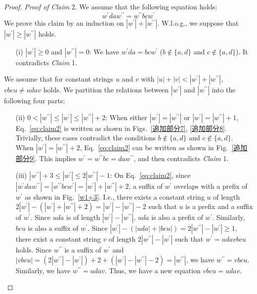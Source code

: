 \begin{proof}
  \noindent
  \textit{Proof of Claim} 2.
  We assume that the following equation holds:
  \begin{equation}
  w^{\prime}daw^{\prime\prime} = w^{\prime\prime}bcw^{\prime}\label{eq:claim2}
  \end{equation}
  We prove this claim by an induction on $|w^{\prime}| + |w^{\prime\prime}|$.
  W.l.o.g., we suppose that $|w^{\prime}| \geq |w^{\prime\prime}|$ holds.
  \begin{enumerate}
    \item[(i)] $|w^{\prime}| \geq 0$ and $|w^{\prime\prime}|=0$:
    We have $w^{\prime}da = bcw^{\prime}$ ($b \not\in \{a,d\}$ and $c \not\in \{a,d\}$).
    It contradicts \textit{Claim} 1.
  \end{enumerate}
  We assume that for constant strings $u$ and $v$ with $|u| + |v| < |w^{\prime}| + |w^{\prime\prime}|$, $vbcu \not= udav$ holds.
  We partition the relations between $|w^{\prime}|$ and $|w^{\prime\prime}|$ into the following four parts:
  \begin{enumerate}
  \item[(ii)] $0 < |w^{\prime\prime}| \le |w^{\prime}| \le |w^{\prime\prime}|+2$:
  When either $|w^{\prime}|=|w^{\prime\prime}|$ or $|w^{\prime}|=|w^{\prime\prime}|+1$, Eq.~\ref{eq:claim2} is written as shown in Figs.~\ref{追加部分7}, \ref{追加部分8}. Trivially, these cases contradict the conditions $b \not\in \{a,d\}$ and $c \not\in \{a,d\}$.
  When $|w^{\prime}|=|w^{\prime\prime}|+2$, Eq.~\ref{eq:claim2} can be written as shown in Fig.~\ref{追加部分9}. This implies $w^{\prime}=w^{\prime\prime}bc=daw^{\prime\prime}$, and then contradicts \textit{Claim} 1.
  \item[(iii)] $|w^{\prime\prime}|+3 \le |w^{\prime}| \le 2|w^{\prime\prime}| - 1$:
  On Eq.~\ref{eq:claim2}, since $|w^{\prime}daw^{\prime\prime}| = |w^{\prime\prime}bcw^{\prime}| = |w^{\prime}| + |w^{\prime\prime}| + 2$, a suffix of $w^{\prime}$ overlaps with a prefix of $w^{\prime}$ as shown in Fig.~\ref{w1+3}. I.e., there exists a constant string $u$ of length $2|w^{\prime}| - (|w^{\prime}| + |w^{\prime\prime}| + 2) = |w^{\prime}| - |w^{\prime\prime}| - 2$ such that $u$ is a prefix and a suffix of $w^{\prime}$.
  Since $uda$ is of length $|w^{\prime}| - |w^{\prime\prime}|$, $uda$ is also a prefix of $w^{\prime}$. Similarly, $bcu$ is also a suffix of $w^{\prime}$.
  Since $|w^{\prime}| - (|uda| + |bcu|) = 2|w^{\prime\prime}| - |w^{\prime}| \ge 1$, there exist a constant string $v$ of length $2|w^{\prime\prime}| - |w^{\prime}|$ such that $w^{\prime} = udavbcu$ holds. Since $w^{\prime\prime}$ is a suffix of $w^{\prime}$ and $|vbcu| = (2|w^{\prime\prime}| - |w^{\prime}|) + 2 + (|w^{\prime}| - |w^{\prime\prime}| - 2) = |w^{\prime\prime}|$, we have $w^{\prime\prime} = vbcu$. Similarly, we have $w^{\prime\prime} = udav$. Thus, we have a new equation $vbcu = udav$.

\end{enumerate}
\end{proof}
